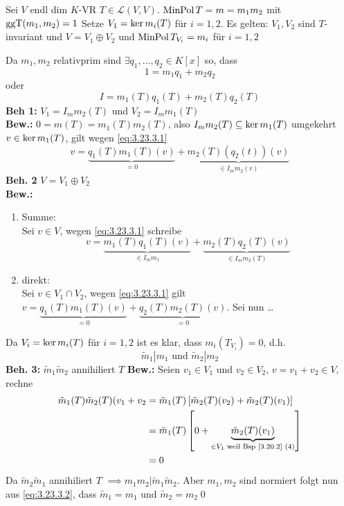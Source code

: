 \begin{subproposition}
	Sei $ V $ endl dim $ K $-VR $ T \in \mathcal{L} (V, V) $.
	$ \operatorname{Min Pol} T = m = m_1 m_2 $ mit $ \operatorname{ggT}(m_1, m_2) = 1 $
	Setze $ V_1 = \operatorname{ker} m_i (T) $ für $ i = 1, 2 $.
	Es gelten: $ V_1, V_2 $ sind $ T $-invariant und $ V = V_1 \oplus V_2 $ und $ \operatorname{Min Pol} T_{V_i} = m_i $ für $ i = 1, 2 $
\end{subproposition}
\begin{subproof*}
	Da $ m_1, m_2 $ relativprim sind $ \exists q_1, \dotsc, q_2 \in K[x] $ so, dass 
	\[
		1 = m_1 q_1 + m_2 q_2
	\]
	oder
	\begin{equation}
		\label{eq:3.23.3.1}
		\tag{$ * $}
		I = m_1(T) q_1(T) + m_2(T) q_2(T)
	\end{equation}
	\textbf{Beh 1:} $ V_1 = I_m  m_2(T) $ und $ V_2 = I_m m_1(T) $\\
	\textbf{Bew.:} $ 0 = m(T) = m_1(T) m_2(T) $, also $ I_m m_2(T) \subseteq \operatorname{ker} m_1(T) $ 
	umgekehrt $ v \in \operatorname{ker} m_1(T) $, gilt wegen \eqref{eq:3.23.3.1}
	\[
		v = \underbrace{q_1(T) m_1(T)(v)}_{= 0} + \underbrace{m_2(T) \left( q_2(t) \right) (v)}_{\in I_m m_2(v)}
	\]
	\textbf{Beh. 2} $ V = V_1 \oplus V_2 $\\
	\textbf{Bew.:}
	\begin{enumerate}[label=(\arabic*)]
		\item Summe:\\
			Sei $ v \in V $, wegen \eqref{eq:3.23.3.1} schreibe
			\[
				v = \underbrace{m_1(T) q_1(T)(v)}_{\in I_m m_1} + \underbrace{m_2(T)q_2(T)(v)}_{\in I_m m_2(T)} 
			\]
		\item direkt:\\
			Sei $ v \in V_1 \cap V_2 $, wegen \eqref{eq:3.23.3.1} gilt $ v = \underbrace{q_1(T) m_1(T)(v)}_{ = 0}  + \underbrace{q_2(T) m_2(T)(v)}_{= 0}  $.
			Sei nun \ldots
	\end{enumerate}
	Da $ V_i = \operatorname{ker} m_i(T) $ für $ i = 1, 2 $ ist es klar, dass $ m_i\left( T_{V_i}  \right) = 0 $, d.h.
	\begin{equation}
		\label{eq:3.23.3.2}
		\tag{$ * * $}
		\tilde m_1 | m_1 \text{ und } 
		\tilde m_2 | m_2
	\end{equation}
	\textbf{Beh. 3:} $ \tilde m_1 \tilde m_2 $ annihiliert $ T $
	\textbf{Bew.:} Seien $ v_1 \in V_1 $ und $ v_2 \in V_2 $, $ v = v_1 + v_2 \in V $, rechne
	\begin{align*}
		\tilde m_1(T) \tilde m_2 (T) (v_1 + v_2 &= 
		\tilde m_1(T) \left[ \tilde m_2 (T) (v_2) + \tilde m_2 (T) (v_1) \right]\\
		~ &= \tilde m_1(T) \left[ 0 + \underbrace{\tilde m_2 (T) (v_1)}_{\in V_1 \text{ weil Bsp \ref{3.20.2} (4)} } \right]\\
		~ &= 0
	\end{align*}
	Da $ \tilde m_2 \tilde m_1 $ annihiliert $ T $ $ \implies m_1m_2 | \tilde m_1 \tilde m_2 $.
	Aber $ m_1, m_2 $ sind normiert folgt nun aus \eqref{eq:3.23.3.2}, dass $ \tilde m_1 = m_1 $ und $ \tilde m_2 = m_2 $\qed
\end{subproof*}


